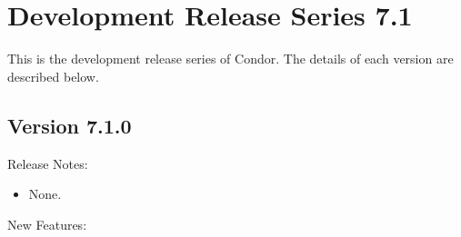 
\section{\label{sec:History-7-1}Development Release Series 7.1}

This is the development release series of Condor.
The details of each version are described below.


\subsection*{\label{sec:New-7-1-0}Version 7.1.0}

\noindent Release Notes:

\begin{itemize}

\item None.

\end{itemize}


\noindent New Features:

